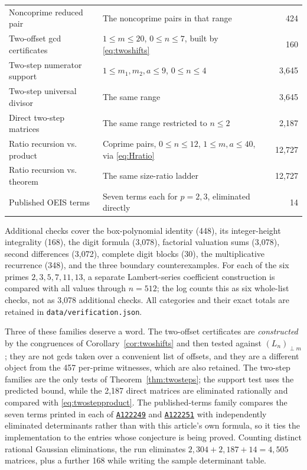 \documentclass[11pt,a4paper]{article}
\numberwithin{equation}{section}
\theoremstyle{definition}
\theoremstyle{remark}
\newcommand{\OEIS}[1]{\href{https://oeis.org/#1}{\texttt{#1}}}
\begin{document}
\begin{center}
\begin{tabular}{@{}p{}p{}r@{}}
Noncoprime reduced pair & The noncoprime pairs in that range & 424\\
Two-offset gcd certificates & $1\leq m\leq20$, $0\leq n\leq7$, built by \eqref{eq:twoshifts} & 160\\
Two-step numerator support & $1\leq m_1,m_2,a\leq9$, $0\leq n\leq4$ & 3,645\\
Two-step universal divisor & The same range & 3,645\\
Direct two-step matrices & The same range restricted to $n\leq2$ & 2,187\\
Ratio recursion vs. product & Coprime pairs, $0\leq n\leq12$, $1\leq m,a\leq40$, via \eqref{eq:Hratio} & 12,727\\
Ratio recursion vs. theorem & The same size-ratio ladder & 12,727\\
Published OEIS terms & Seven terms each for $p=2,3$, eliminated directly & 14\\
\bottomrule
\end{tabular}
\end{center}

Additional checks cover the box-polynomial identity (448), its integer-height integrality (168), the digit formula (3,078), factorial valuation sums (3,078), second differences (3,072), complete digit blocks (30), the multiplicative recurrence (348), and the three boundary counterexamples. For each of the six primes $2,3,5,7,11,13$, a separate Lambert-series coefficient construction is compared with all values through $n=512$; the log counts this as six whole-list checks, not as 3,078 additional checks. All categories and their exact totals are retained in \texttt{data/verification.json}.

Three of these families deserve a word. The two-offset certificates are \emph{constructed} by the congruences of Corollary~\ref{cor:twoshifts} and then tested against $(L_n)_{\perp m}$; they are not gcds taken over a convenient list of offsets, and they are a different object from the 457 per-prime witnesses, which are also retained. The two-step families are the only tests of Theorem~\ref{thm:twosteps}; the support test uses the predicted bound, while the 2,187 direct matrices are eliminated rationally and compared with \eqref{eq:twostepproduct}. The published-terms family compares the seven terms printed in each of \OEIS{A122249} and \OEIS{A122251} with independently eliminated determinants rather than with this article's own formula, so it ties the implementation to the entries whose conjecture is being proved. Counting distinct rational Gaussian eliminations, the run eliminates $2{,}304+2{,}187+14=4{,}505$ matrices, plus a further 168 while writing the sample determinant table.
\end{document}

